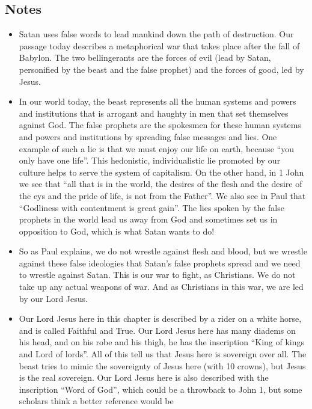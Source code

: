 \subsection*{Notes}
\begin{itemize}
  \item{Satan uses false words to lead mankind down the path of destruction.
  Our passage today describes a metaphorical war that takes place after the
  fall of Babylon.  The two bellingerants are the forces of evil (lead by
  Satan, personified by the beast and the false prophet) and the forces of
  good, led by Jesus.}
  \item{In our world today, the beast represents all the human systems and
  powers and institutions that is arrogant and haughty in men that set
  themselves against God.  The false prophets are the spokesmen for these
  human systems and powers and institutions by spreading false messages and
  lies.  One example of such a lie is that we must enjoy our life on earth,
  because ``you only have one life''.  This hedonistic, individualistic lie
  promoted by our culture helps to serve the system of capitalism.  On the
  other hand, in 1 John we see that ``all that is in the world, the desires
  of the flesh and the desire of the eys and the pride of life, is not from
  the Father''.  We also see in Paul that ``Godliness with contentment is
  great gain''.  The lies spoken by the false prophets in the world lead us
  away from God and sometimes set us in opposition to God, which is what
  Satan wants to do!  }
  \item{So as Paul explains, we do not wrestle against flesh and blood, but
  we wrestle against these false ideologies that Satan's false prophets
  spread and we need to wrestle against Satan.  This is our war to fight, as
  Christians.  We do not take up any actual weapons of war.  And as
  Christians in this war, we are led by our Lord Jesus.}
  \item{Our Lord Jesus here in this chapter is described by a rider on a
  white horse, and is called Faithful and True.  Our Lord Jesus here has many
  diadems on his head, and on his robe and his thigh, he has the inscription
  ``King of kings and Lord of lords''.  All of this tell us that Jesus here
  is sovereign over all.  The beast tries to mimic the sovereignty of Jesus
  here (with 10 crowns), but Jesus is the real sovereign.  Our Lord Jesus
  here is also described with the inscription ``Word of God'', which could be
  a throwback to John 1, but some scholars think a better reference would be
}
\end{itemize}
